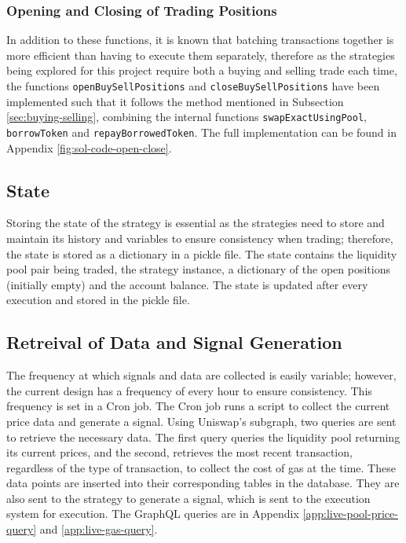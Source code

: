 \subsubsection{Opening and Closing of Trading Positions}
In addition to these functions, it is known that batching transactions together is more efficient than having to execute them separately, therefore as the strategies being explored for this project require both a buying and selling trade each time, the functions \texttt{openBuySellPositions} and \texttt{closeBuySellPositions} have been implemented such that it follows the method mentioned in Subsection \ref{sec:buying-selling}, combining the internal functions \texttt{swapExactUsingPool}, \texttt{borrowToken} and \texttt{repayBorrowedToken}. The full implementation can be found in Appendix \ref{fig:sol-code-open-close}.

\subsection{State}
Storing the state of the strategy is essential as the strategies need to store and maintain its history and variables to ensure consistency when trading; therefore, the state is stored as a dictionary in a pickle file. The state contains the liquidity pool pair being traded, the strategy instance, a dictionary of the open positions (initially empty) and the account balance. The state is updated after every execution and stored in the pickle file.

\subsection{Retreival of Data and Signal Generation}
The frequency at which signals and data are collected is easily variable; however, the current design has a frequency of every hour to ensure consistency. This frequency is set in a Cron job. The Cron job runs a script to collect the current price data and generate a signal. Using Uniswap's subgraph, two queries are sent to retrieve the necessary data. The first query queries the liquidity pool returning its current prices, and the second, retrieves the most recent transaction, regardless of the type of transaction, to collect the cost of gas at the time. These data points are inserted into their corresponding tables in the database. They are also sent to the strategy to generate a signal, which is sent to the execution system for execution. The GraphQL queries are in Appendix \ref{app:live-pool-price-query} and \ref{app:live-gas-query}.

